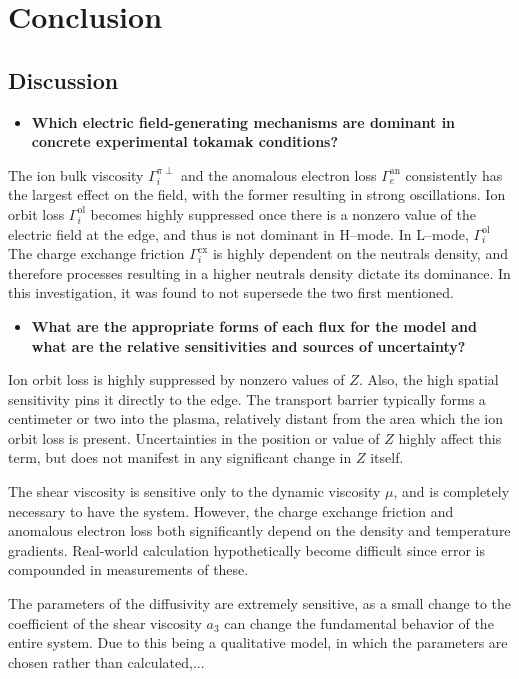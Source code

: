 \chapter{Conclusion} \label{chapter:conclusion}
\section{Discussion} \label{sec:discussion}
\begin{itemize}
	\item \textbf{Which electric field-generating mechanisms are dominant in concrete experimental tokamak conditions?}
\end{itemize}

The ion bulk viscosity $\Gamma_i^{\pi\perp}$ and the anomalous electron loss $\Gamma_e^\text{an}$ consistently has the largest effect on the field, with the former resulting in strong oscillations.
Ion orbit loss $\Gamma_i^\text{ol}$ becomes highly suppressed once there is a nonzero value of the electric field at the edge, and thus is not dominant in H--mode.
In L--mode, $\Gamma_i^\text{ol}$
The charge exchange friction $\Gamma_i^\text{cx}$ is highly dependent on the neutrals density, and therefore processes resulting in a higher neutrals density dictate its dominance.
In this investigation, it was found to not supersede the two first mentioned.


\begin{itemize}
	\item \textbf{What are the appropriate forms of each flux for the model and what are the relative sensitivities and sources of uncertainty?}
\end{itemize}

Ion orbit loss is highly suppressed by nonzero values of $Z$.
Also, the high spatial sensitivity pins it directly to the edge.
The transport barrier typically forms a centimeter or two into the plasma, relatively distant from the area which the ion orbit loss is present.
Uncertainties in the position or value of $Z$ highly affect this term, but does not manifest in any significant change in $Z$ itself.

The shear viscosity is sensitive only to the dynamic viscosity $\mu$, and is completely necessary to have the system.
However, the charge exchange friction and anomalous electron loss both significantly depend on the density and temperature gradients.
Real-world calculation hypothetically become difficult since error is compounded in measurements of these.

The parameters of the diffusivity are extremely sensitive, as a small change to the coefficient of the shear viscosity $a_3$ can change the fundamental behavior of the entire system.
Due to this being a qualitative model, in which the parameters are chosen rather than calculated,...


